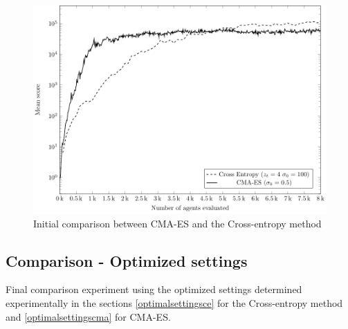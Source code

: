 \begin{figure}[H]
\begin{center}
\includegraphics[scale=0.8]{plots/cmaCePlot}
\end{center}
\caption{Initial comparison between CMA-ES and the Cross-entropy method \label{fig:appendixCMA_VS_CE_00}}
\end{figure}

\clearpage

\subsection{Comparison - Optimized settings}
Final comparison experiment using the optimized settings determined experimentally 
in the sections \ref{optimalsettingsce} for the Cross-entropy method 
and \ref{optimalsettingscma} for CMA-ES.

